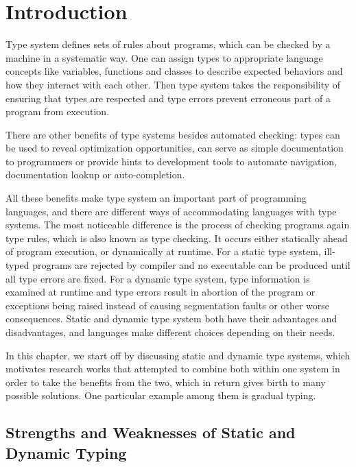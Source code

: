 
\renewcommand{\thechapter}{1}

\chapter{Introduction}

Type system defines sets of rules about programs, which can be checked by a machine
in a systematic way.
One can assign types to appropriate language concepts like
variables, functions and classes to describe expected behaviors
and how they interact with each other.
Then type system takes the responsibility of ensuring that types are respected and
type errors prevent erroneous part of a program from execution.

There are other benefits of type systems besides automated checking:
types can be used to reveal optimization opportunities,
can serve as simple documentation to programmers or
provide hints to development tools to automate navigation, documentation lookup
or auto-completion.

All these benefits make type system an important part of programming languages,
and there are different ways of accommodating languages with type systems.
The most noticeable difference is the process of checking programs again type rules,
which is also known as type checking.
It occurs either statically ahead of program execution, or dynamically at runtime.
For a static type system, ill-typed programs are rejected by compiler and
no executable can be produced until all type errors are fixed.
For a dynamic type system, type information is examined at runtime and type errors result
in abortion of the program or exceptions being raised
instead of causing segmentation faults or other worse consequences.
Static and dynamic type system both have their advantages and disadvantages,
and languages make different choices depending on their needs.

In this chapter, we start off by discussing static and dynamic type systems,
which motivates research works that attempted to combine both within one system
in order to take the benefits from the two,
which in return gives birth to many possible solutions.
One particular example among them is gradual typing.

\section{Strengths and Weaknesses of Static and Dynamic Typing}

